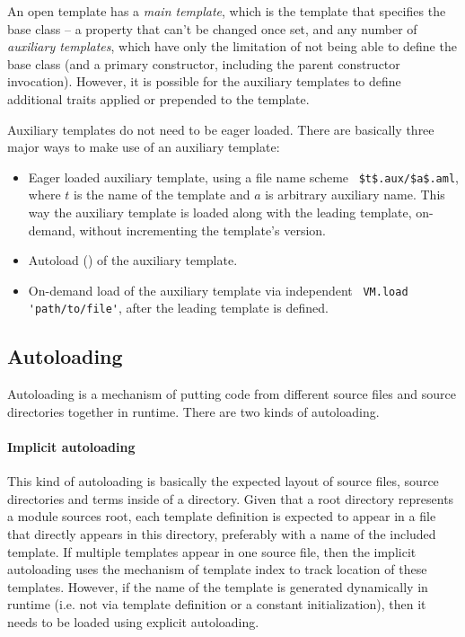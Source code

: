 An open template has a {\em main template}, which is the template that specifies the base class -- a property that can't be changed once set, and any number of {\em auxiliary templates}, which have only the limitation of not being able to define the base class (and a primary constructor, including the parent constructor invocation). However, it is possible for the auxiliary templates to define additional traits applied or prepended to the template. 

Auxiliary templates do not need to be eager loaded. There are basically three major ways to make use of an auxiliary template:
\begin{itemize}
  \item Eager loaded auxiliary template, using a file name scheme ~\lstinline!$t$.aux/$a$.aml!, where $t$ is the name of the template and $a$ is arbitrary auxiliary name. This way the auxiliary template is loaded along with the leading template, on-demand, without incrementing the template's version.
  \item Autoload () of the auxiliary template. 
  \item On-demand load of the auxiliary template via independent ~\lstinline[deletekeywords={to}]!VM.load 'path/to/file'!, after the leading template is defined.
\end{itemize}





\subsection{Autoloading}
\label{sec:autoloading}

Autoloading is a mechanism of putting code from different source files and source directories together in runtime. There are two kinds of autoloading.

\paragraph{Implicit autoloading}
This kind of autoloading is basically the expected layout of source files, source directories and terms inside of a directory. Given that a root directory represents a module sources root, each template definition is expected to appear in a file that directly appears in this directory, preferably with a name of the included template. If multiple templates appear in one source file, then the implicit autoloading uses the mechanism of template index to track location of these templates. However, if the name of the template is generated dynamically in runtime (i.e. not via template definition or a constant initialization), then it needs to be loaded using explicit autoloading. 

